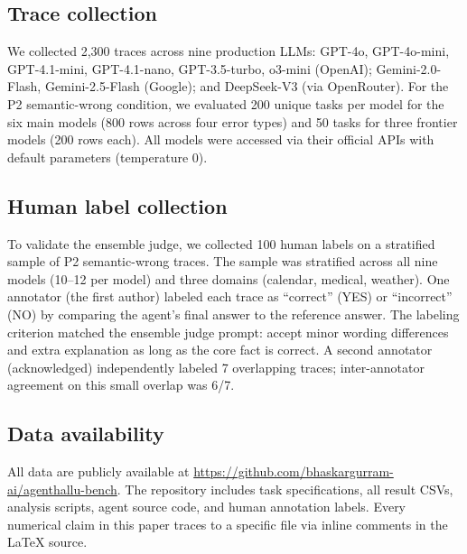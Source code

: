 \documentclass[preprint,review,12pt,3p]{elsarticle}
\begin{document}
\subsection{Trace collection}

We collected 2{,}300 traces across nine production LLMs:
GPT-4o, GPT-4o-mini, GPT-4.1-mini, GPT-4.1-nano, GPT-3.5-turbo,
o3-mini (OpenAI); Gemini-2.0-Flash, Gemini-2.5-Flash (Google); and
DeepSeek-V3 (via OpenRouter).
For the P2 semantic-wrong condition, we evaluated 200 unique tasks
per model for the six main models (800 rows across four error types)
and 50 tasks for three frontier models (200 rows each).
All models were accessed via their official APIs with default
parameters (temperature 0).

\subsection{Human label collection}

To validate the ensemble judge, we collected 100 human labels on a
stratified sample of P2 semantic-wrong traces.
The sample was stratified across all nine models (10--12 per model)
and three domains (calendar, medical, weather).
One annotator (the first author) labeled each trace as ``correct''
(YES) or ``incorrect'' (NO) by comparing the agent's final answer to
the reference answer.
The labeling criterion matched the ensemble judge prompt: accept minor
wording differences and extra explanation as long as the core fact is
correct.
A second annotator (acknowledged) independently labeled 7 overlapping
traces; inter-annotator agreement on this small overlap was 6/7.

\subsection{Data availability}

All data are publicly available at
\url{https://github.com/bhaskargurram-ai/agenthallu-bench}.
The repository includes task specifications, all result CSVs, analysis
scripts, agent source code, and human annotation labels.
Every numerical claim in this paper traces to a specific file via
inline comments in the \LaTeX{} source.


\end{document}
